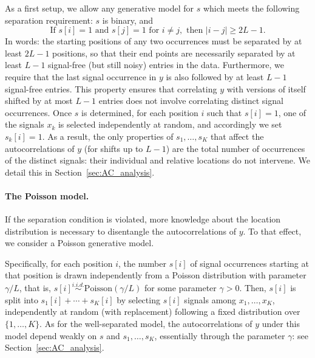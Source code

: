 \documentclass[12pt]{article}
\newcommand{\1}{\mathbf{1}}
\newcommand{\Poisson}{\text{Poisson}}
\theoremstyle{plain}
\theoremstyle{definition}
\theoremstyle{remark}
\theoremstyle{plain}
\theoremstyle{remark}
\theoremstyle{plain}
\theoremstyle{plain}
\theoremstyle{plain}
\numberwithin{equation}{section}
\begin{document}
As a first setup, we allow any generative model for $s$ which meets the following separation requirement: $s$ is binary, and
\begin{equation}
\textrm{If } s[i] = 1 \textrm{ and } s[j] = 1 \textrm{ for } i \neq j, \textrm{ then } |i - j| \geq 2L-1.
\label{eq:spacing}
\end{equation}
In words: the starting positions of any two occurrences  must be separated by at least $2L-1$ positions, so that their end points are necessarily separated by at least $L-1$ signal-free (but still noisy) entries in the data.
Furthermore, we require that the last signal occurrence in $y$ is also followed by at least $L-1$ signal-free entries.
This property ensures that correlating $y$ with versions of itself shifted by at most $L-1$ entries does not involve correlating distinct signal occurrences. Once $s$ is determined, for each position $i$ such that $s[i] = 1$, one of the signals $x_k$ is selected independently at random, and accordingly we set $s_k[i] = 1$. As a result, the only properties of $s_1, \ldots, s_K$ that affect the autocorrelations of $y$ (for shifts up to $L-1$) are the total number of occurrences of the distinct signals: their individual and relative locations do not intervene. We detail this in Section~\ref{sec:AC_analysis}.

\paragraph{The Poisson model.}

If the separation condition is violated, more knowledge about the location distribution is necessary to disentangle the autocorrelations of $y$. To that effect, we consider a Poisson generative model.

Specifically, for each position $i$, the number $s[i]$ of signal occurrences starting at that position is drawn independently from a Poisson distribution with parameter $\gamma/L$, that is, ${s[i] \overset{i.i.d.}{\sim} \Poisson(\gamma / L)}$ for some parameter $\gamma > 0$. Then, $s[i]$ is split into $s_1[i] + \cdots + s_K[i]$ by selecting $s[i]$ signals among $x_1, \ldots, x_K$, independently at random (with replacement) following a fixed distribution over $\{1,\ldots,K\}$.
As for the well-separated model, the autocorrelations of $y$ under this model depend weakly on $s$ and $s_1, \ldots, s_K$, essentially through the parameter $\gamma$: see Section~\ref{sec:AC_analysis}.
\end{document}
